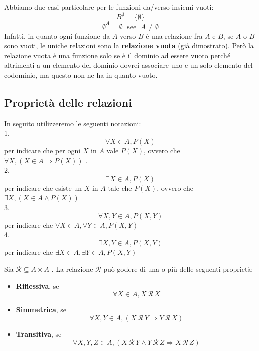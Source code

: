 \documentclass[
  a4paper,
]{article}
\providecommand{\tightlist}{%
  \setlength{\itemsep}{0pt}\setlength{\parskip}{0pt}}
\begin{document}
Abbiamo due casi particolare per le funzioni da/verso insiemi vuoti: \[
B^{\emptyset} = \{ \emptyset\}
\] \[
\emptyset^A = \emptyset \; \text{ see }\; A \not = \emptyset
\] Infatti, in quanto ogni funzione da \(A\) verso \(B\) è una relazione
fra \(A\) e \(B\), se \(A\) o \(B\) sono vuoti, le uniche relazioni sono
la \textbf{relazione vuota} (già dimostrato). Però la relazione vuota è
una funzione solo se è il dominio ad essere vuoto perché altrimenti a un
elemento del dominio dovrei associare uno e un solo elemento del
codominio, ma questo non ne ha in quanto vuoto.

\hypertarget{proprietuxe0-delle-relazioni}{%
\subsection{Proprietà delle
relazioni}\label{proprietuxe0-delle-relazioni}}

\begin{examplebox}

In seguito utilizzeremo le seguenti notazioni:\\
1. \[
\forall X \in A, P(X)
\] per indicare che per ogni \(X\) in \(A\) vale \(P(X)\), ovvero che
\(\forall X, (X \in A \Rightarrow P(X))\) .\\
2. \[
\exists X \in A, P(X)
\] per indicare che esiste un \(X\) in \(A\) tale che \(P(X)\), ovvero
che \(\exists X, (X \in A \land P(X))\)\\
3. \[
\forall X, Y \in A, P(X, Y)
\] per indicare che \(\forall X \in A, \forall Y \in A, P(X, Y)\)\\
4. \[
\exists X, Y \in A, P(X, Y)
\] per indicare che \(\exists X \in A, \exists Y \in A, P(X, Y)\)

\end{examplebox}

Sia \(\mathcal{R} \subseteq A \times A\) . La relazione \(\mathcal{R}\)
può godere di una o più delle seguenti proprietà:

\begin{itemize}
\tightlist
\item
  \textbf{Riflessiva}, se \[
  \forall X \in A, X \, \mathcal{R} \, X
  \]
\item
  \textbf{Simmetrica}, se \[
  \forall X, Y \in A, (X \, \mathcal{R} \, Y \Rightarrow Y \, \mathcal{R} \, X)
  \]
\item
  \textbf{Transitiva}, se \[
  \forall X, Y, Z \in A, (X \, \mathcal{R} \, Y \land Y \, \mathcal{R} \, Z \Rightarrow X \, \mathcal{R} \, Z)
  \]
\end{itemize}
\end{document}
